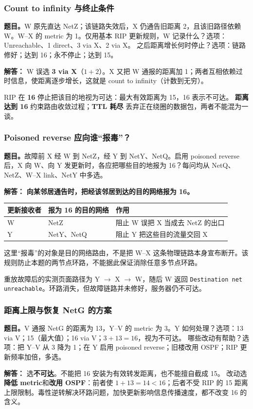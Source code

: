 \documentclass[11pt,a4paper,fontset=fandol]{ctexart}
\renewcommand{\exercisequestion}[2]{%
  \Needspace{5\baselineskip}%
  \subsubsection{#2}\label{exercise:#1}%
}
\renewenvironment{checkedsolution}
  {\par\nopagebreak[4]\textbf{解答：}\ignorespaces}
  {\par}
\begin{document}
\exercisequestion{SC2008-HW03-Q10}{Count to infinity 与终止条件}
\textbf{题目。}W 原先直达 NetZ；该链路失效后，X 仍通告旧距离 2，且该旧路径依赖 W。W--X 的 metric 为 1。仅用基本 RIP 更新规则，W 记录什么？选项：Unreachable、1 direct、3 via X、2 via X。
之后距离增长何时停止？选项：链路修好；达到 16；永不停止；达到 15。
\begin{checkedsolution}
W 误选 \textbf{3 via X}（$1+2$）。X 又把 W 通报的距离加 1；两者互相依赖过时信息，使距离逐步增长，这就是 count to infinity（计数到无穷）。

RIP 在 \textbf{16} 停止把该目的地视为可达：最大有效距离为 15，16 表示不可达。
\textbf{距离达到 16} 约束路由收敛过程；\textbf{TTL 耗尽} 丢弃正在绕圈的数据包，两者不能混为一谈。
\end{checkedsolution}

\exercisequestion{SC2008-HW03-Q11}{Poisoned reverse 应向谁“报毒”？}
\textbf{题目。}故障前 X 经 W 到 NetZ，经 Y 到 NetY、NetQ。启用 poisoned reverse 后，X 向 W、向 Y 发更新时，各应把哪些目的地报为 16？每问均从 NetQ、NetZ、W--X link、NetY 中多选。
\begin{checkedsolution}
\textbf{向某邻居通告时，把经该邻居到达的目的网络报为 16。}
\begin{center}
\small
\begin{tabular}{@{}lll@{}}
\toprule
更新接收者 & 报为 16 的目的网络 & 作用 \\
\midrule
W & NetZ & 阻止 W 误把 X 当成去 NetZ 的出口 \\
Y & NetY、NetQ & 阻止 Y 把这些目的流量交回 X \\
\bottomrule
\end{tabular}
\end{center}
这里“报毒”的对象是目的网络路由，不是把 W--X 这条物理链路本身宣布断开。该规则防止本题的两节点环路，不能据此保证消除任意多节点环路。

重放故障后的实测页面路径为 Y $\to$ X $\to$ W，随后 W 返回 \texttt{Destination net unreachable}。环路消失，但故障链路并未修好，服务器仍不可达。
\end{checkedsolution}

\exercisequestion{SC2008-HW03-Q12}{距离上限与恢复 NetG 的方案}
\textbf{题目。}V 通报 NetG 的距离为 13，Y--V 的 metric 为 3。Y 如何处理？选项：13 via V；15（最大值）；16 via V；$3+13=16$，视为不可达。
哪些改动有帮助？选项：把 Y--V 从 3 降为 1；在 Y 启用 poisoned reverse；旧楼改用 OSPF；RIP 更新频率加倍，多选。
\begin{checkedsolution}
选\textbf{不可达}。不能把 16 安装为有效转发距离，也不能擅自截成 15。
改动选\textbf{降低 metric}和\textbf{改用 OSPF}：前者使 $1+13=14<16$；后者不受 RIP 的 15 距离上限限制。毒性逆转解决环路问题，加快更新影响信息传播速度，都不改变 16 的含义。
\end{checkedsolution}
\end{document}

